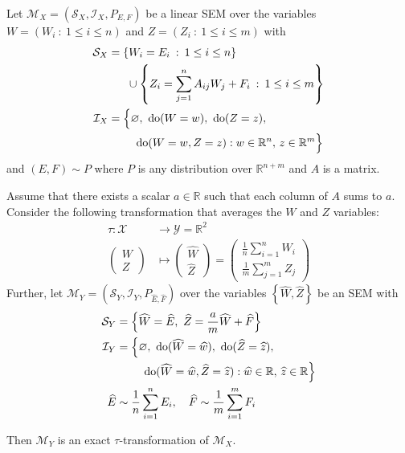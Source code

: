 \begin{theorem}\label{theorem:micro-macro}
Let ${\mathcal{M}_X = \left(\mathcal{S}_X, \mathcal{I}_X, P_{E,F} \right)}$ be a linear SEM over the variables ${W=\left( W_i \: : \: 1\leq  i \leq n \right)}$ and ${Z=\left( Z_i \: : \: 1\leq  i \leq m \right)}$ with
%
\begin{align*}
\mathcal{S}_X &= \left\lbrace W_i = E_i \:  : \: 1 \leq i \leq n  \right\rbrace \\
& \quad \ \  \cup \left\lbrace Z_i = \sum_{j=1}^n A_{ij}W_j  + F_{i} \:  : \: 1\leq i \leq m \right\rbrace \\
%
\mathcal{I}_X &= \Big{\{} \nulli, \ \doop(W= w), \ \doop(Z= z), \\
& \qquad\ \doop(W= w, Z= z ) :   w \in \mathbb{R}^{n}, \, z \in \mathbb{R}^m \Big{\}}
%
\end{align*}
%
and $(E,F)  \sim P$ where $P$ is any distribution over $\mathbb{R}^{n+m}$ and $A$ is a matrix.

Assume that there exists a scalar $a\in \mathbb{R}$ such that each column of $A$ sums to $a$. Consider the following transformation that averages the $W$ and $Z$ variables:
%
\begin{align*}
\tau : \mathcal{X} &\rightarrow \mathcal{Y} = \mathbb{R}^2 \\
\begin{pmatrix} W \\ Z \end{pmatrix} &\mapsto \begin{pmatrix} \widehat{W} \\ \widehat{Z} \end{pmatrix} = \begin{pmatrix} \frac{1}{n}\sum_{i=1}^n W_i \\ \frac{1}{m}\sum_{j=1}^m Z_j  \end{pmatrix}
\end{align*}
%
Further, let $\mathcal{M}_Y = \left(\mathcal{S}_Y, \mathcal{I}_Y, P_{\widehat{E},\widehat{F}} \right)$ over the variables ${\left\lbrace \widehat{W}, \widehat{Z} \right\rbrace}$ be an SEM with
%
\begin{align*}
\mathcal{S}_Y &= \Big\lbrace \widehat{W} = \widehat{E}, \ \widehat{Z} = \frac{a}{m}\widehat{W} + \widehat{F} \Big\rbrace \\
%
\mathcal{I}_Y &= \Big{\{} \nulli,\ \doop(\widehat{W}= \widehat{w}), \ \doop(\widehat{Z}= \widehat{z}), \\
& \qquad\ \doop(\widehat{W}= \widehat{w}, \widehat{Z}= \widehat{z} ) :   \widehat{w} \in \mathbb{R}, \, \widehat{z} \in \mathbb{R} \Big{\}} \\
%
\widehat{E}  & \sim \frac{1}{n}\sum_{i=1}^{n} E_i, \quad
\widehat{F}  \sim \frac{1}{m}\sum_{i=1}^{m} F_i
\end{align*}

Then $\mathcal{M}_Y$ is an exact $\tau$-transformation of $\mathcal{M}_X$.
\end{theorem}

